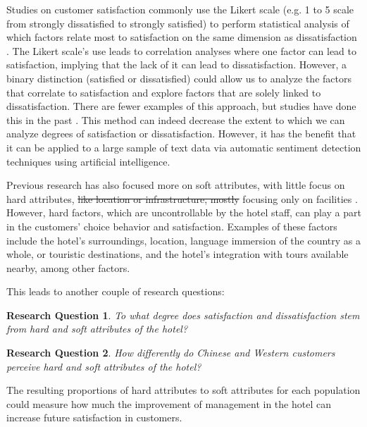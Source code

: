 \documentclass[smallextended,natbib]{svjour3}       %
\makeatletter
\newtheorem{rsq}{Research Question}
\newcounter{subrsq}
\newenvironment{subrsq}
         {%
          \setcounter{subrsq}{0}%
          \stepcounter{rsq}%
          \edef\saved@rsq{\thersq}%
          \let\c@rsq\c@subrsq     %
          \renewcommand{\thersq}{\saved@rsq\alph{rsq}}%
         }
         {}
\providecommand{\DIFadd}[1]{{\protect\color{blue}\uwave{#1}}} %
\providecommand{\DIFdel}[1]{{\protect\color{red}\sout{#1}}}                      %
\providecommand{\DIFaddbegin}{} %
\providecommand{\DIFaddend}{} %
\providecommand{\DIFdelbegin}{} %
\providecommand{\DIFdelend}{} %
\newcommand{\DIFscaledelfig}{0.5}
\newlength{\DIFdelgraphicswidth} %
\newlength{\DIFdelgraphicsheight} %
\newcommand{\DIFaddincludegraphics}[2][]{{\color{blue}\fbox{\DIFOincludegraphics[#1]{#2}}}} %
\newcommand{\DIFdelincludegraphics}[2][]{%
\sbox{\DIFdelgraphicsbox}{\DIFOincludegraphics[#1]{#2}}%
\settoboxwidth{\DIFdelgraphicswidth}{\DIFdelgraphicsbox} %
\settoboxtotalheight{\DIFdelgraphicsheight}{\DIFdelgraphicsbox} %
\scalebox{\DIFscaledelfig}{%
\parbox[b]{\DIFdelgraphicswidth}{\usebox{\DIFdelgraphicsbox}\\[-\baselineskip] \rule{\DIFdelgraphicswidth}{0em}}\llap{\resizebox{\DIFdelgraphicswidth}{\DIFdelgraphicsheight}{%
\setlength{\unitlength}{\DIFdelgraphicswidth}%
\begin{picture}(1,1)%
\thicklines\linethickness{2pt} %
{\color[rgb]{1,0,0}\put(0,0){\framebox(1,1){}}}%
{\color[rgb]{1,0,0}\put(0,0){\line( 1,1){1}}}%
{\color[rgb]{1,0,0}\put(0,1){\line(1,-1){1}}}%
\end{picture}%
}\hspace*{3pt}}} %
} %
\DeclareRobustCommand{\DIFaddbegin}{\DIFOaddbegin \let\includegraphics\DIFaddincludegraphics} %
\DeclareRobustCommand{\DIFaddend}{\DIFOaddend \let\includegraphics\DIFOincludegraphics} %
\DeclareRobustCommand{\DIFdelbegin}{\DIFOdelbegin \let\includegraphics\DIFdelincludegraphics} %
\DeclareRobustCommand{\DIFdelend}{\DIFOaddend \let\includegraphics\DIFOincludegraphics} %
\makeatother
\begin{document}
    Studies on customer satisfaction \cite[e.g.][]{truong2009, romao2014, wu2009} commonly use the Likert scale \cite[][]{likert1932technique} (e.g. 1 to 5 scale from strongly dissatisfied to strongly satisfied) to perform statistical analysis of which factors relate most to satisfaction on the same dimension as dissatisfaction \cite[e.g.][]{chan201518, choi2000}. The Likert scale's use leads to correlation analyses where one factor can lead to satisfaction, implying that the lack of it can lead to dissatisfaction. However, a binary distinction (satisfied or dissatisfied) could allow us to analyze the factors that correlate to satisfaction and explore factors that are solely linked to dissatisfaction. There are fewer examples of this approach, but studies have done this in the past \cite[e.g.][]{zhou2014}. This method can indeed decrease the extent to which we can analyze degrees of satisfaction or dissatisfaction. However, it has the benefit that it can be applied to a large sample of text data via automatic sentiment detection techniques using artificial intelligence. 

    Previous research has also focused more on soft attributes, with little focus on hard attributes, \DIFdelbegin \DIFdel{like location or infrastructure, mostly }\DIFdelend \DIFaddbegin \DIFadd{if only }\DIFaddend focusing only on facilities \cite[e.g.][]{shanka2004, choi2001}. However, hard factors, which are uncontrollable by the hotel staff, can play a part in the customers' choice behavior and satisfaction. Examples of these factors include the hotel's surroundings, location, language immersion of the country as a whole, or touristic destinations, and the hotel's integration with tours available nearby, among other factors. 

    This leads to another couple of research questions:

    \begin{subrsq}
    \begin{rsq}
    \label{rsq:hard_soft}
    To what degree does satisfaction and dissatisfaction stem from hard and soft attributes of the hotel?
    \end{rsq}

    \begin{rsq}
    \label{rsq:hard_soft_diff}
    How differently do Chinese and Western customers perceive hard and soft attributes of the hotel?
    \end{rsq}
    \end{subrsq}

    The resulting proportions of hard attributes to soft attributes for each population could measure how much the improvement of management in the hotel can increase future satisfaction in customers. 
\end{document}
